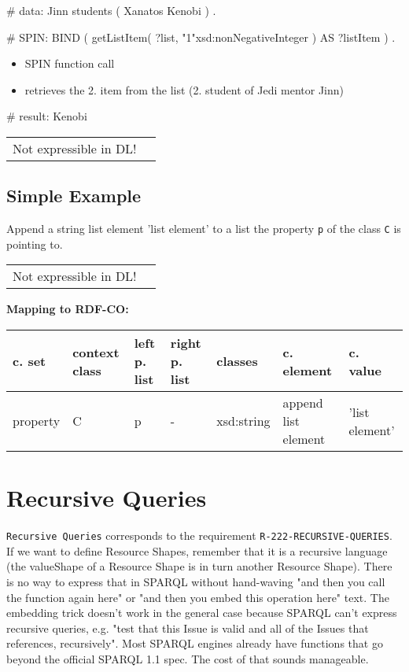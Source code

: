 \documentclass{llncs}
\newcommand{\ms}[1]{\texttt{#1}}
\newenvironment{gcotable}{
  \scriptsize
  \sffamily
  \vspace{0cm}
	\begin{center}
	\textbf{\vspace{0.4cm}Mapping to RDF-CO:} \\
  \begin{tabular}{l|l|l|l|l|l|l}
	\hline
  \textbf{c. set} & \textbf{context class} & \textbf{left p. list} & \textbf{right p. list} & \textbf{classes} & \textbf{c. element} & \textbf{c. value} \\
  \hline

}{
  \hline
  \end{tabular}
	\end{center}
}
\newenvironment{DL}{
\vspace{0cm}
	\begin{center}
  \begin{tabular}{r l}

}{
  \end{tabular}
	\end{center}
}
\begin{document}
\begin{ex}
# data:
Jinn students 
     ( Xanatos Kenobi ) . 
\end{ex}

\begin{ex}
# SPIN:
BIND ( getListItem( ?list, "1"xsd:nonNegativeInteger ) AS ?listItem ) .
\end{ex}

\begin{itemize}
  \item SPIN function call
	\item retrieves the 2. item from the list (2. student of Jedi mentor Jinn)
\end{itemize}

\begin{ex}
# result:
Kenobi
\end{ex}

\begin{DL}
Not expressible in DL!
\end{DL}

\subsection{Simple Example}

Append a string list element 'list element' to a list the property \ms{p} of the class \ms{C} is pointing to.

\begin{DL}
Not expressible in DL!
\end{DL}

\begin{gcotable}
property & C & p & - & xsd:string & append list element & 'list element' \\
\end{gcotable}

\section{Recursive Queries}

\ms{Recursive Queries} corresponds to the requirement
\ms{R-222-RECURSIVE-QUERIES}.
If we want to define Resource Shapes, remember that it is a recursive
language (the valueShape of a Resource Shape is in turn another
Resource Shape). There is no way to express that in SPARQL without
hand-waving "and then you call the function again here" or "and then
you embed this operation here" text.  The embedding trick doesn't work
in the general case because SPARQL can't express recursive queries,
e.g. "test that this Issue is valid and all of the Issues that
references, recursively".
Most SPARQL engines already have
functions that go beyond the official SPARQL 1.1 spec. The cost of that
sounds manageable.
\end{document}
